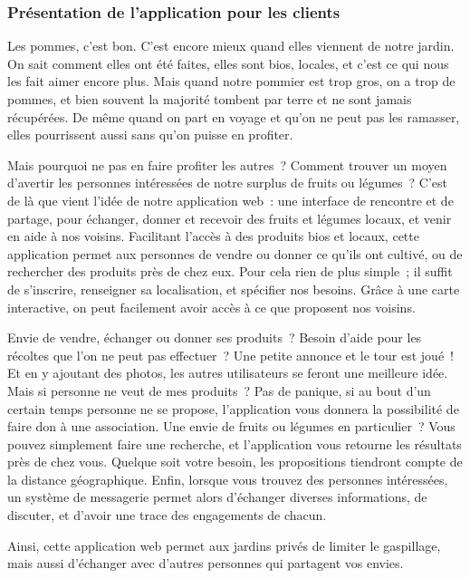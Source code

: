 \documentclass{article}
\begin{document}
\subsubsection{Présentation de l'application pour les clients}

Les pommes, c'est bon. C'est encore mieux quand elles viennent de notre jardin. On sait comment elles ont été faites, elles sont bios, locales, et c'est ce qui nous les fait aimer encore plus. Mais quand notre pommier est trop gros, on a trop de pommes, et bien souvent la majorité tombent par terre et ne sont jamais récupérées. De même quand on part en voyage et qu'on ne peut pas les ramasser, elles pourrissent aussi sans qu'on puisse en profiter.

Mais pourquoi ne pas en faire profiter les autres ? Comment trouver un moyen d'avertir les personnes intéressées de notre surplus de fruits ou légumes ? C'est de là que vient l'idée de notre application web : une interface de rencontre et de partage, pour échanger, donner et recevoir des fruits et légumes locaux, et venir en aide à nos voisins.
Facilitant l'accès à des produits bios et locaux, cette application permet aux personnes de vendre ou donner ce qu'ils ont cultivé, ou de rechercher des produits près de chez eux. Pour cela rien de plus simple ; il suffit de s'inscrire, renseigner sa localisation, et spécifier nos besoins. Grâce à une carte interactive, on peut facilement avoir accès à ce que proposent nos voisins.

Envie de vendre, échanger ou donner ses produits ? Besoin d'aide pour les récoltes que l'on ne peut pas effectuer ? Une petite annonce et le tour est joué ! Et en y ajoutant des photos, les autres utilisateurs se feront une meilleure idée. Mais si personne ne veut de mes produits ? Pas de panique, si au bout d'un certain temps personne ne se propose, l'application vous donnera la possibilité de faire don à une association.
Une envie de fruits ou légumes en particulier ? Vous pouvez simplement faire une recherche, et l'application vous retourne les résultats près de chez vous. Quelque soit votre besoin, les propositions tiendront compte de la distance géographique.
Enfin, lorsque vous trouvez des personnes intéressées, un système de messagerie permet alors d'échanger diverses informations, de discuter, et d'avoir une trace des engagements de chacun.

Ainsi, cette application web permet aux jardins privés de limiter le gaspillage, mais aussi d'échanger avec d'autres personnes qui partagent vos envies.
\end{document}
